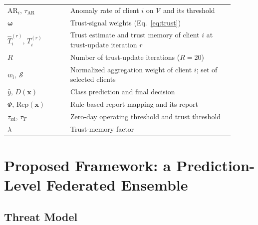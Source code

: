 \documentclass[pdflatex,sn-mathphys-num]{sn-jnl}
\begin{document}
{\begin{table}[htbp]
\begin{tabular}{@{}p{0.25\linewidth}p{0.65\linewidth}@{}}
$\mathrm{AR}_i,\,\tau_{\mathrm{AR}}$ &
Anomaly rate of client $i$ on $\mathcal{V}$ and its threshold \\

$\boldsymbol{\omega}$ &
Trust-signal weights (Eq.~\ref{eq:trust}) \\

$\hat{T}_i^{(r)},\,T_i^{(r)}$ &
Trust estimate and trust memory of client $i$
at trust-update iteration $r$ \\

$R$ &
Number of trust-update iterations ($R=20$) \\

$w_i,\,\mathcal{S}$ &
Normalized aggregation weight of client $i$; set of selected clients \\

$\hat y,\,D(\mathbf{x})$ &
Class prediction and final decision \\

$\Phi,\,\mathrm{Rep}(\mathbf{x})$ &
Rule-based report mapping and its report \\

$\tau_{\mathrm{zd}},\,\tau_T$ &
Zero-day operating threshold and trust threshold \\

$\lambda$ &
Trust-memory factor \\

\bottomrule
\end{tabular}
\end{table}
\section{Proposed Framework: {\color{black} a Prediction-Level Federated Ensemble}}
\label{sec:framework}

\subsection{Threat Model}\label{sec:threat} 

}
\end{document}
